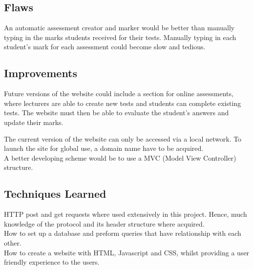 \documentclass[a4paper,12pt]{article}
\numberwithin{equation}{section} %
\numberwithin{figure}{section}
\begin{document}
\subsection{Flaws}
An automatic assessment creator and marker would be better than manually typing in the marks students received for their tests. Manually typing in each student's mark for each assessment could become slow and tedious. 

\subsection{Improvements}
Future versions of the website could include a section for online assessments, where lecturers are able to create new tests and students can complete existing tests. The website must then be able to evaluate the student's answers and update their marks.

The current version of the website can only be accessed via a local network. To launch the site for global use, a domain name have to be acquired.\\

A better developing scheme would be to use a MVC (Model View Controller) structure. 

\subsection{Techniques Learned}
HTTP post and get requests where used extensively in this project. Hence, much knowledge of the protocol and its header structure where acquired. \\

How to set up a database and preform queries that have relationship with each other.\\

How to create a website with HTML, Javascript and CSS, whilst providing a user friendly experience to the users.


\nocite{*} %

\end{document}
